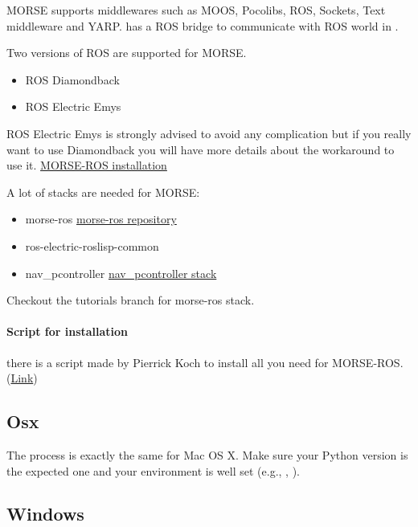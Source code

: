 MORSE supports middlewares such as MOOS, Pocolibs, ROS, Sockets, Text
middleware and YARP. \urbi has a ROS bridge to communicate with ROS world in
\us.

Two versions of ROS are supported for MORSE.
\begin{itemize}
  \item ROS Diamondback
  \item ROS Electric Emys
\end{itemize}

ROS Electric Emys is strongly advised to avoid any complication but if you
really want to use Diamondback you will have more details about the
workaround to use it.
\href{http://www.openrobots.org/morse/doc/latest/user/installation/mw/ros.html}
{MORSE-ROS installation}

A lot of stacks are needed for MORSE:
\begin{itemize}
\item morse-ros \href{git clone http://code.in.tum.de/git/morse-ros.git}
  {morse-ros repository}
\item ros-electric-roslisp-common
\item nav\_pcontroller
  \href{http://www.ros.org/browse/details.php?name=nav\_pcontroller}
  {nav\_pcontroller stack}
\end{itemize}

Checkout the tutorials branch for morse-ros stack.

\paragraph{Script for installation} there is a script made by Pierrick Koch to
install all you need for MORSE-ROS.
(\href{https://github.com/pierriko/proteus/blob/master/morse-ros.sh}{Link})
\subsection{Osx}

The process is exactly the same for Mac OS X. Make sure your Python version
is the expected one and your environment is well set (e.g.,
, ).

\subsection{Windows}

